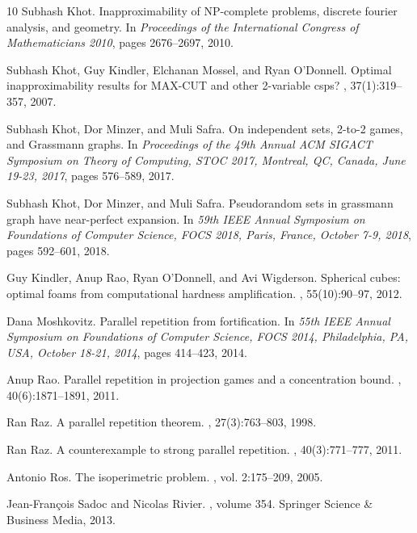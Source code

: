 \documentclass[10pt,a4paper]{article}
\begin{document}
\begin{thebibliography}{10}
Subhash Khot.
\newblock Inapproximability of {NP}-complete problems, discrete fourier
  analysis, and geometry.
\newblock In {\em Proceedings of the International Congress of Mathematicians
  2010}, pages 2676--2697, 2010.

Subhash Khot, Guy Kindler, Elchanan Mossel, and Ryan O'Donnell.
\newblock Optimal inapproximability results for {MAX-CUT} and other 2-variable
  csps?
, 37(1):319--357, 2007.

Subhash Khot, Dor Minzer, and Muli Safra.
\newblock On independent sets, 2-to-2 games, and {G}rassmann graphs.
\newblock In {\em Proceedings of the 49th Annual {ACM} {SIGACT} Symposium on
  Theory of Computing, {STOC} 2017, Montreal, QC, Canada, June 19-23, 2017},
  pages 576--589, 2017.

Subhash Khot, Dor Minzer, and Muli Safra.
\newblock Pseudorandom sets in grassmann graph have near-perfect expansion.
\newblock In {\em 59th {IEEE} Annual Symposium on Foundations of Computer
  Science, {FOCS} 2018, Paris, France, October 7-9, 2018}, pages 592--601,
  2018.

Guy Kindler, Anup Rao, Ryan O'Donnell, and Avi Wigderson.
\newblock Spherical cubes: optimal foams from computational hardness
  amplification.
, 55(10):90--97, 2012.

Dana Moshkovitz.
\newblock Parallel repetition from fortification.
\newblock In {\em 55th {IEEE} Annual Symposium on Foundations of Computer
  Science, {FOCS} 2014, Philadelphia, PA, USA, October 18-21, 2014}, pages
  414--423, 2014.

Anup Rao.
\newblock Parallel repetition in projection games and a concentration bound.
, 40(6):1871--1891, 2011.

Ran Raz.
\newblock A parallel repetition theorem.
, 27(3):763--803, 1998.

Ran Raz.
\newblock A counterexample to strong parallel repetition.
, 40(3):771--777, 2011.

Antonio Ros.
\newblock The isoperimetric problem.
, vol.
  2:175--209, 2005.

Jean-Fran{\c{c}}ois Sadoc and Nicolas Rivier.
, volume 354.
\newblock Springer Science \& Business Media, 2013.


\end{thebibliography}
\end{document}
